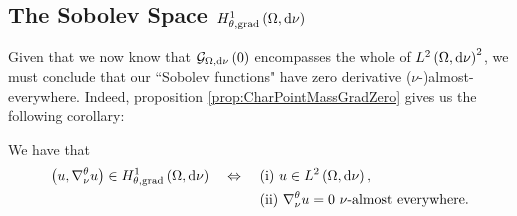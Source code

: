 \subsection{The Sobolev Space $H^1_{\theta, \mathrm{grad}}\left( \Omega, \mathrm{d}\nu \right)$} \label{appS:VertexSobSpace}
Given that we now know that $\mathcal{G}_{ \Omega, \mathrm{d}\nu}\left( 0 \right)$ encompasses the whole of $L^{2}\left( \Omega,\mathrm{d}\nu \right)^2$, we must conclude that our ``Sobolev functions" have zero derivative ($\nu$-)almost-everywhere.
Indeed, proposition \ref{prop:CharPointMassGradZero} gives us the following corollary:
\begin{cory} \label{eq:CharPointMassSpace}
	We have that
	\begin{align*}
		\left( u,\nabla^{\theta}_{\nu}u \right)\in H^1_{\theta, \mathrm{grad}}\left( \Omega, \mathrm{d}\nu \right) \quad\Leftrightarrow\quad 
		& \ \text{(i)} \ u\in L^{2}\left( \Omega,\mathrm{d}\nu \right), \\
		& \ \text{(ii)} \ \nabla^{\theta}_{\nu}u = 0 \ \nu\text{-almost everywhere}.
	\end{align*}
\end{cory}
